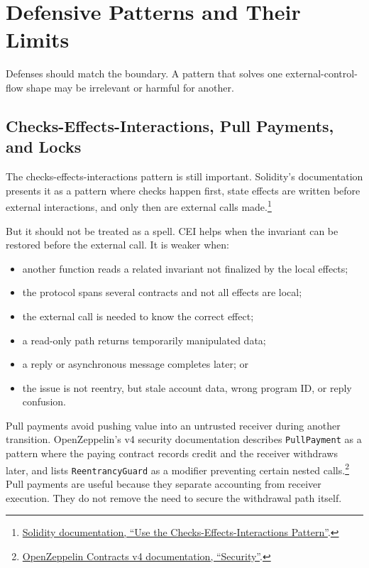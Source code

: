 \section{Defensive Patterns and Their Limits}

Defenses should match the boundary. A pattern that solves one external-control-flow shape may be irrelevant or harmful for another.

\subsection{Checks-Effects-Interactions, Pull Payments, and Locks}

The checks-effects-interactions pattern is still important. Solidity's documentation presents it as a pattern where checks happen first, state effects are written before external interactions, and only then are external calls made.\footnote{\href{https://docs.soliditylang.org/en/latest/security-considerations.html\#use-the-checks-effects-interactions-pattern}{Solidity documentation, ``Use the Checks-Effects-Interactions Pattern''}.}

But it should not be treated as a spell. CEI helps when the invariant can be restored before the external call. It is weaker when:

\begin{itemize}
\item another function reads a related invariant not finalized by the local effects;
\item the protocol spans several contracts and not all effects are local;
\item the external call is needed to know the correct effect;
\item a read-only path returns temporarily manipulated data;
\item a reply or asynchronous message completes later; or
\item the issue is not reentry, but stale account data, wrong program ID, or reply confusion.
\end{itemize}

Pull payments avoid pushing value into an untrusted receiver during another transition. OpenZeppelin's v4 security documentation describes \texttt{PullPayment} as a pattern where the paying contract records credit and the receiver withdraws later, and lists \texttt{ReentrancyGuard} as a modifier preventing certain nested calls.\footnote{\href{https://docs.openzeppelin.com/contracts/4.x/api/security}{OpenZeppelin Contracts v4 documentation, ``Security''}.} Pull payments are useful because they separate accounting from receiver execution. They do not remove the need to secure the withdrawal path itself.

